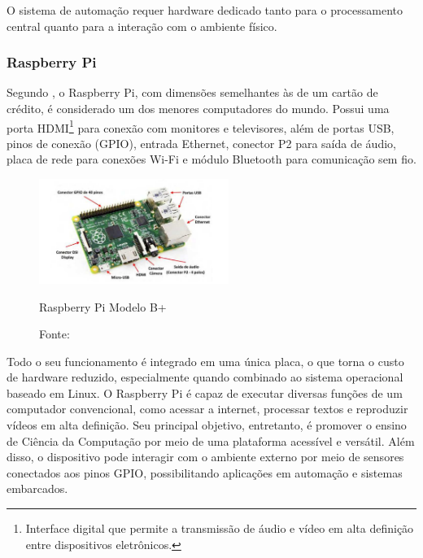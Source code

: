         O sistema de automação requer hardware dedicado tanto para o processamento central quanto para a interação com o ambiente físico.

        \subsubsection*{Raspberry Pi}

            Segundo \cite{juca2018aplicaccoes}, o Raspberry Pi, com dimensões semelhantes às de um cartão de crédito, é considerado um dos menores computadores do mundo. Possui uma porta HDMI\footnote{Interface digital que permite a transmissão de áudio e vídeo em alta definição entre dispositivos eletrônicos.} para conexão com monitores e televisores, além de portas USB, pinos de conexão (GPIO), entrada Ethernet, conector P2 para saída de áudio, placa de rede para conexões Wi-Fi e módulo Bluetooth para comunicação sem fio.

            \begin{figure}[H]
                \centering
                \caption{ }  
                \centering
                \label{fig:cont}
                \includegraphics[width=0.55\textwidth]{imagens/raspberry.png}
                \caption*{Raspberry Pi Modelo B+}
                \caption*{Fonte: \cite{juca2018aplicaccoes}}
            \end{figure}

            Todo o seu funcionamento é integrado em uma única placa, o que torna o custo de hardware reduzido, especialmente quando combinado ao sistema operacional baseado em Linux. O Raspberry Pi é capaz de executar diversas funções de um computador convencional, como acessar a internet, processar textos e reproduzir vídeos em alta definição.
            Seu principal objetivo, entretanto, é promover o ensino de Ciência da Computação por meio de uma plataforma acessível e versátil.
            Além disso, o dispositivo pode interagir com o ambiente externo por meio de sensores conectados aos pinos GPIO, possibilitando aplicações em automação e sistemas embarcados.

